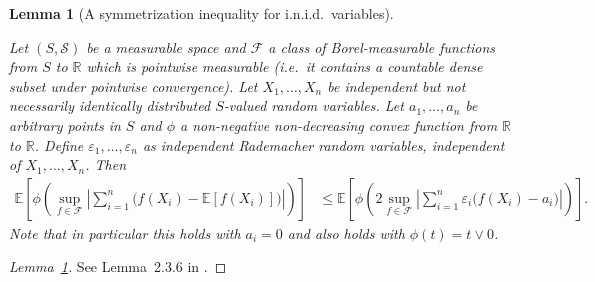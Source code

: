 \documentclass[11pt,lof]{puthesis}
\newcommand{\R}{\ensuremath{\mathbb{R}}}
\newcommand{\E}{\ensuremath{\mathbb{E}}}
\newcommand{\cF}{\ensuremath{\mathcal{F}}}
\newcommand{\cS}{\ensuremath{\mathcal{S}}}
\theoremstyle{break}
\newtheorem{lemma}{Lemma}[section]
\theoremstyle{proof}
\newtheorem{proof}{Proof}
\begin{document}
\begin{lemma}[A symmetrization inequality for i.n.i.d.\ variables]
  \label{lem:kernel_app_symmetrization}

  Let $(S, \cS)$ be a measurable space and
  $\cF$ a class of Borel-measurable functions
  from $S$ to $\R$ which is pointwise measurable
  (i.e.\ it contains a countable dense subset
  under pointwise convergence).
  Let $X_1, \ldots, X_n$
  be independent
  but not necessarily identically distributed
  $S$-valued random variables.
  Let $a_1, \ldots, a_n$ be arbitrary points in $S$
  and $\phi$ a non-negative non-decreasing convex function
  from $\R$ to $\R$.
  Define $\varepsilon_1, \ldots, \varepsilon_n$
  as independent Rademacher
  random variables,
  independent of $X_1, \ldots, X_n$.
  Then
  \begin{align*}
    \E \left[
      \phi \left(
        \sup_{f \in \cF}
        \left|
        \sum_{i=1}^n
        \Big(
          f(X_i)
          - \E[f(X_i)]
        \Big)
        \right|
      \right)
    \right]
    &\leq
    \E \left[
      \phi \left(
        2
        \sup_{f \in \cF}
        \left|
        \sum_{i=1}^n
        \varepsilon_i
        \Big(
          f(X_i)
          - a_i
        \Big)
        \right|
      \right)
    \right].
  \end{align*}
  Note that in particular this holds with $a_i = 0$
  and also holds with $\phi(t) = t \vee 0$.

\end{lemma}

\begin{proof}[Lemma~\ref{lem:kernel_app_symmetrization}]

  See Lemma~2.3.6 in
  \citet{van1996weak}.
\end{proof}
\end{document}
